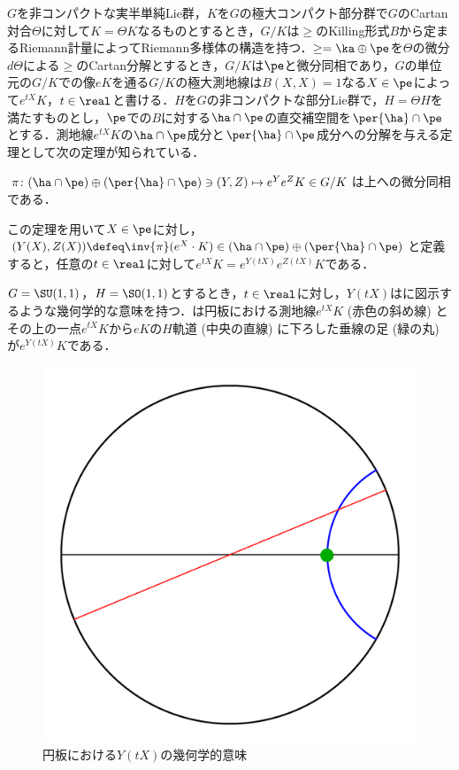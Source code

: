 $G$を非コンパクトな実半単純Lie群，$K$を$G$の極大コンパクト部分群で$G$のCartan対合$\Theta$に対して$K = \Theta K $なるものとするとき，$G/K$は$\ge$のKilling形式$B$から定まるRiemann計量によってRiemann多様体の構造を持つ．$\ge = \ka \oplus \pe $を$\Theta$の微分$d\Theta$による$\ge$のCartan分解とするとき，$G/K$は$\pe$と微分同相であり，$G$の単位元の$G/K$での像$eK$を通る$G/K$の極大測地線は$B(X, X) = 1 $なる$X\in \pe$によって$e^{tX}K $，$t\in \real$と書ける．$H$を$G$の非コンパクトな部分Lie群で，$H = \Theta H$を満たすものとし，$\pe$での$B$に対する$\ha\cap \pe$の直交補空間を$\per{\ha}\cap\pe$とする．測地線$e^{tX}K$の$\ha\cap\pe$成分と$\per{\ha}\cap\pe$成分への分解を与える定理として次の定理が知られている．

\begin{thm*}\cite[Lemma~6.1]{kob89}\label{thm:kob89-lem6.1}

  $\pi\colon  (\ha\cap\pe)\oplus (\per{\ha}\cap \pe) \ni (Y, Z)\mapsto e^{Y}e^{Z}K \in G/K $は上への微分同相である．
\end{thm*}
この定理を用いて$X\in \pe$に対し，$(Y(X), Z(X))\defeq \inv{\pi}(e^X\cdot K)\in (\ha\cap\pe)\oplus (\per{\ha}\cap \pe)$と定義すると，任意の$t\in \real$に対して$e^{tX}K = e^{Y(tX)}e^{Z(tX)}K $である．

$G = \SU(1,1) $，$H = \SO(1,1) $とするとき，$t\in \real$に対し，$Y(tX) $はに図示するような幾何学的な意味を持つ．は{\Poincare}円板における測地線$e^{tX}K$ (赤色の斜め線) とその上の一点$e^{tX}K$から$eK$の$H$軌道 (中央の直線) に下ろした垂線の足 (緑の丸) が$e^{Y(tX)}K $である．
\begin{figure}[H]
  \centering
  \includegraphics[scale=0.25]{../graph/y-and-z.pdf}
  \caption{{\Poincare}円板における$Y(tX) $の幾何学的意味}
  \label{fig:y-and-z}
\end{figure}

